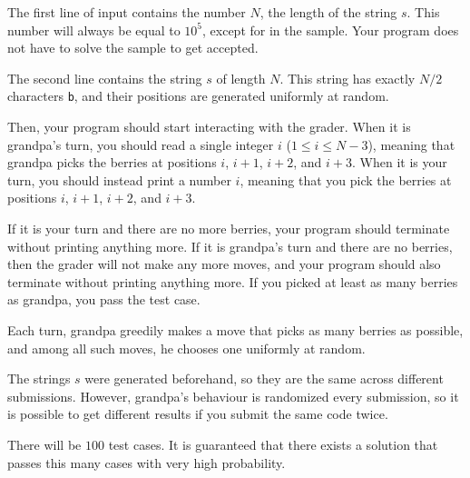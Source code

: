 

The first line of input contains the number $N$, the length of the string $s$. This number will always be 
equal to $10^5$, except for in the sample. Your program does not have to solve the sample to get accepted.

The second line contains the string $s$ of length $N$. This string has exactly
$N/2$ characters \verb|b|, and their positions are generated uniformly at random.

Then, your program should start interacting with the grader. When it is grandpa's turn, you should read a 
single integer $i$ ($1 \leq i \leq N-3$), meaning that grandpa picks the berries at positions $i$, $i+1$, $i+2$, and $i+3$. When
it is your turn, you should instead print a number $i$, meaning that you pick the berries at positions $i$, $i+1$, $i+2$, and $i+3$.

If it is your turn and there are no more berries, your program should terminate without printing anything more.
If it is grandpa's turn and there are no berries, then the grader will not make any more moves, and your program should 
also terminate without printing anything more. If you picked at least as many berries as
grandpa, you pass the test case.

Each turn, grandpa greedily makes a move that picks as many berries as possible, and among all such moves, he chooses 
one uniformly at random.

The strings $s$ were generated beforehand, so they are the same across 
different submissions. However, grandpa's behaviour is randomized every submission, so it is 
possible to get different results if you submit the same code twice. 

There will be $100$ test cases. It is guaranteed that there exists a solution that passes this many cases with very high probability.

